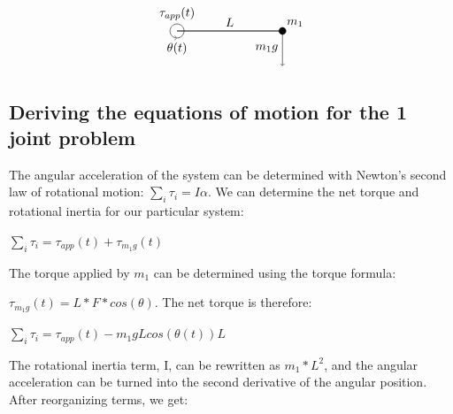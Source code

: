 \documentclass{article}
\begin{document}
\vspace{24pt}

\[\begin{tikzpicture}
  \draw[->] (0, -0.2) arc (-90:270:0.2cm);
  \draw (0, 0.5) node {$\tau_{app}(t)$};
  \draw (0, -0.5) node {$\theta(t)$};
  
  \draw[thick] (0,0) -- (3,0);
  \draw (1.5,0) node[anchor=south] {$L$};
  
  \filldraw (3,0) circle (0.1cm);
  \draw (3,0) node[anchor=south west] {$m_1$};

  \draw[->] (3,0) -- (3, -1);
  \draw (3,-0.5) node[anchor=east] {$m_1g$};

\end{tikzpicture}\]


\vspace{24pt}

\newpage

\subsection{Deriving the equations of motion for the 1 joint problem}

\vspace{24pt}

\noindent \justifying The angular acceleration of the system can be determined with Newton's second law of rotational motion: $\sum_i \tau_i = I \alpha$. We can determine the net torque and rotational inertia for our particular system:

\vspace{24pt}

\centering $\sum_i \tau_i = \tau_{app}(t) + \tau_{m_1g}(t)$

\vspace{24pt}

\noindent \justifying The torque applied by $m_1$ can be determined using the torque formula: 

\centering $\tau_{m_1g}(t) = L*F*cos(\theta)$. The net torque is therefore:

\vspace{24pt}

\centering $\sum_i \tau_i = \tau_{app}(t) - m_1gLcos(\theta(t))L$

\vspace{24pt}

\noindent \justifying The rotational inertia term, I, can be rewritten as $m_1*L^2$, and the angular acceleration can be turned into the second derivative of the angular position. After reorganizing terms, we get:
\vspace{24pt}
\end{document}
